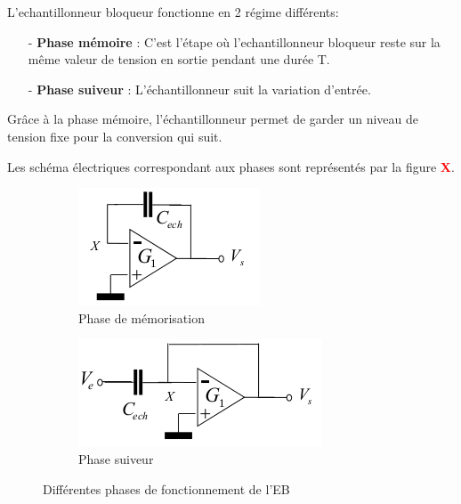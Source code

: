 \documentclass[11pt]{article}
\begin{document}
\medskip
L'echantillonneur bloqueur fonctionne en 2 r\'egime diff\'erents:
\begin{itemize}
  \item[-]\textbf{Phase m\'emoire} : C'est l'\'etape o\`u l'echantillonneur bloqueur
  reste sur la m\^eme valeur de tension en sortie pendant une dur\'ee T.
  \item[-]\textbf{Phase suiveur} : L'\'echantillonneur suit la variation d'entr\'ee.
\end{itemize}

Gr\^ace \`a la phase m\'emoire, l'\'echantillonneur permet de garder un niveau de tension
fixe pour la conversion qui suit.

Les sch\'ema \'electriques correspondant aux phases sont repr\'esent\'es par la figure \textbf{\textcolor{red}{X}}.

\clearpage

\begin{figure}[!htb]
  \begin{subfigure}[t]{.5\linewidth}
      \centering
      \includegraphics[width=0.6\linewidth]{memoire_EB.png}
      \caption{Phase de m\'emorisation}
      \label{fig:sfigEBmem}
  \end{subfigure}%
  \begin{subfigure}[t]{.5\linewidth}
    \centering
    \includegraphics[width=0.6\linewidth]{suiveur_EB.png}
    \caption{Phase suiveur}
    \label{fig:sfigEBsuiv}
  \end{subfigure}%
  \caption{Diff\'erentes phases de fonctionnement de l'EB}
  \label{fig:figEBfonct}
\end{figure}
\end{document}
